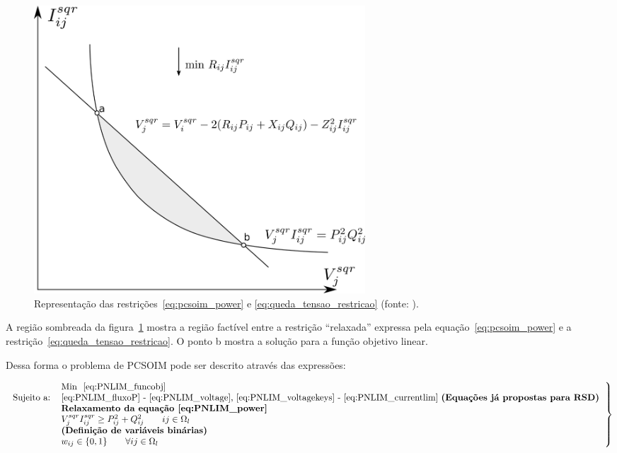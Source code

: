 \begin{figure}[H]
    \centering
    \includegraphics[width =0.6\textwidth]{5_Formulation/pcsoim.png}
    \caption{Representação das restrições~\eqref{eq:pcsoim_power} e \eqref{eq:queda_tensao_restricao} (fonte: \cite{Tatiane2011APLICACAORADIAIS}).}
    \label{fig:pcsoim}
\end{figure}


A região sombreada da figura~\ref{fig:pcsoim} mostra a região factível entre a restrição ``relaxada'' expressa pela equação~\eqref{eq:pcsoim_power} e a restrição~\eqref{eq:queda_tensao_restricao}.
O ponto b mostra a solução para a função objetivo linear.

Dessa forma o problema de PCSOIM pode ser descrito através das expressões:


\begin{tcolorbox}[breakable,pad at break*=1mm,colback=white!10,title =\textbf{Problema de PCSOIM para RSD}]

\begin{equation}\label{eq:pcsoim}
\left.
    \begin{tabular}{ll}
    & Min ~\eqref{eq:PNLIM_funcobj}\\
    Sujeito a: &\eqref{eq:PNLIM_fluxoP} - \eqref{eq:PNLIM_voltage}, \eqref{eq:PNLIM_voltagekeys} - \eqref{eq:PNLIM_currentlim} \textbf{(Equações já propostas para RSD)}\\
    & \textbf{Relaxamento da equação~\eqref{eq:PNLIM_power}}\\
    & $V_{j}^{sqr}I_{ij}^{sqr} \geq P_{ij}^{2} + Q_{ij}^{2} \qquad ij\in\Omega_{l}$\\
    & \textbf{(Definição de variáveis binárias)}\\
    & $w_{ij}\in\{0,1\}\qquad\forall ij\in\Omega_{l}$
    \end{tabular}
\right \}
\end{equation} 
\end{tcolorbox}
